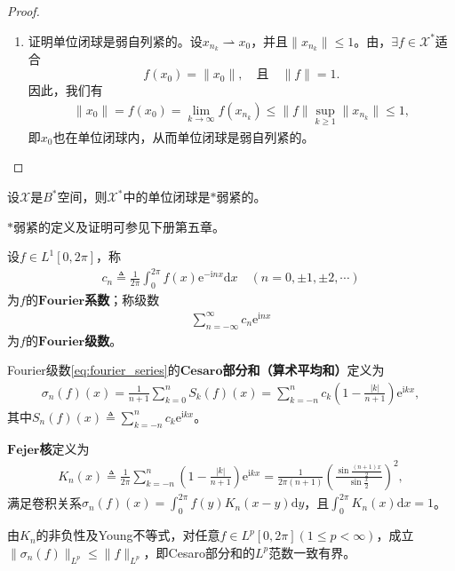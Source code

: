 \documentclass[../../main.tex]{subfiles}%
\begin{document}
\begin{proof}
\begin{enumerate}[(1)]
\item 证明单位闭球是弱自列紧的。设$x_{n_k}\rightharpoonup x_0$，并且$\|x_{n_k}\|\leqslant1$。由，$\exists f\in\mathscr{X}^*$适合
$$f(x_0)=\|x_0\|,\quad\text{且}\quad\|f\|=1.$$
因此，我们有
\begin{align*}
\|x_0\|=f(x_0)=\lim\limits_{k\to\infty}f(x_{n_k})\leqslant\|f\|\sup\limits_{k\geqslant1}\|x_{n_k}\|\leqslant1,
\end{align*}
即$x_0$也在单位闭球内，从而单位闭球是弱自列紧的。
\end{enumerate}

\end{proof}

\begin{theorem}[Alaoglu定理]
设$\mathscr{X}$是$B^*$空间，则$\mathscr{X}^*$中的单位闭球是$*$弱紧的。
\end{theorem}
\begin{remark}
$*$弱紧的定义及证明可参见下册第五章。
\end{remark}

\begin{definition}
设$f\in L^1[0,2\pi]$，称
\begin{align*}
c_n\triangleq\frac{1}{2\pi}\int_{0}^{2\pi}f(x)\mathrm{e}^{-\mathrm{i}nx}\mathrm{d}x\quad(n=0,\pm1,\pm2,\cdots)
\end{align*}
为$f$的$\mathbf{Fourier}$\textbf{系数}；称级数
\begin{align}
\sum\limits_{n=-\infty}^{\infty}c_n\mathrm{e}^{\mathrm{i}nx}\label{eq:fourier_series}
\end{align}
为$f$的$\mathbf{Fourier}$\textbf{级数}。
\end{definition}

\begin{definition}
Fourier级数\eqref{eq:fourier_series}的$\mathbf{Cesaro}$\textbf{部分和（算术平均和）}定义为
\begin{align}
\sigma_n(f)(x)=\frac{1}{n+1}\sum\limits_{k=0}^{n}S_k(f)(x)
=\sum\limits_{k=-n}^{n}c_k\left(1-\frac{|k|}{n+1}\right)\mathrm{e}^{\mathrm{i}kx},\label{eq:cesaro_sum}
\end{align}
其中$S_n(f)(x)\triangleq\sum\limits_{k=-n}^{n}c_k\mathrm{e}^{\mathrm{i}kx}$。
\end{definition}

\begin{definition}[Fejer核]
$\mathbf{Fejer}$\textbf{核}定义为
\begin{align*}
K_n(x)\triangleq\frac{1}{2\pi}\sum\limits_{k=-n}^{n}\left(1-\frac{|k|}{n+1}\right)\mathrm{e}^{\mathrm{i}kx}
=\frac{1}{2\pi(n+1)}\left(\frac{\sin\frac{(n+1)x}{2}}{\sin\frac{x}{2}}\right)^2,
\end{align*}
满足卷积关系$\sigma_n(f)(x)=\int_{0}^{2\pi}f(y)K_n(x-y)\mathrm{d}y$，且$\int_{0}^{2\pi}K_n(x)\mathrm{d}x=1$。
\end{definition}
\begin{remark}
由$K_n$的非负性及Young不等式，对任意$f\in L^p[0,2\pi](1\leqslant p<\infty)$，成立$\|\sigma_n(f)\|_{L^p}\leqslant\|f\|_{L^p}$，即Cesaro部分和的$L^p$范数一致有界。
\end{remark}
\end{document}
